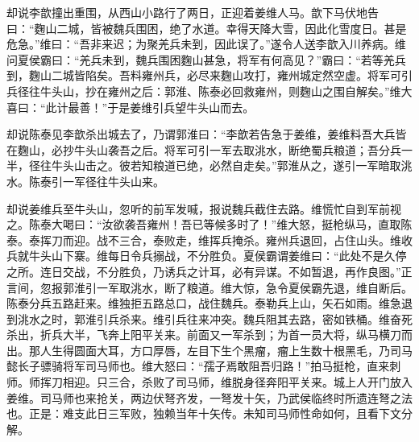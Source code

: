 却说李歆撞出重围，从西山小路行了两日，正迎着姜维人马。歆下马伏地告曰：“麴山二城，皆被魏兵围困，绝了水道。幸得天降大雪，因此化雪度日。甚是危急。”维曰：“吾非来迟；为聚羌兵未到，因此误了。”遂令人送李歆入川养病。维问夏侯霸曰：“羌兵未到，魏兵围困麴山甚急，将军有何高见？”霸曰：“若等羌兵到，麴山二城皆陷矣。吾料雍州兵，必尽来麴山攻打，雍州城定然空虚。将军可引兵径往牛头山，抄在雍州之后：郭淮、陈泰必回救雍州，则麴山之围自解矣。”维大喜曰：“此计最善！”于是姜维引兵望牛头山而去。

却说陈泰见李歆杀出城去了，乃谓郭淮曰：“李歆若告急于姜维，姜维料吾大兵皆在麴山，必抄牛头山袭吾之后。将军可引一军去取洮水，断绝蜀兵粮道；吾分兵一半，径往牛头山击之。彼若知粮道已绝，必然自走矣。”郭淮从之，遂引一军暗取洮水。陈泰引一军径往牛头山来。

却说姜维兵至牛头山，忽听的前军发喊，报说魏兵截住去路。维慌忙自到军前视之。陈泰大喝曰：“汝欲袭吾雍州！吾已等候多时了！”维大怒，挺枪纵马，直取陈泰。泰挥刀而迎。战不三合，泰败走，维挥兵掩杀。雍州兵退回，占住山头。维收兵就牛头山下寨。维每日令兵搦战，不分胜负。夏侯霸谓姜维曰：“此处不是久停之所。连日交战，不分胜负，乃诱兵之计耳，必有异谋。不如暂退，再作良图。”正言间，忽报郭淮引一军取洮水，断了粮道。维大惊，急令夏侯霸先退，维自断后。陈泰分兵五路赶来。维独拒五路总口，战住魏兵。泰勒兵上山，矢石如雨。维急退到洮水之时，郭淮引兵杀来。维引兵往来冲突。魏兵阻其去路，密如铁桶。维奋死杀出，折兵大半，飞奔上阳平关来。前面又一军杀到；为首一员大将，纵马横刀而出。那人生得圆面大耳，方口厚唇，左目下生个黑瘤，瘤上生数十根黑毛，乃司马懿长子骠骑将军司马师也。维大怒曰：“孺子焉敢阻吾归路！”拍马挺枪，直来刺师。师挥刀相迎。只三合，杀败了司马师，维脱身径奔阳平关来。城上人开门放入姜维。司马师也来抢关，两边伏弩齐发，一弩发十矢，乃武侯临终时所遗连弩之法也。正是：难支此日三军败，独赖当年十矢传。未知司马师性命如何，且看下文分解。